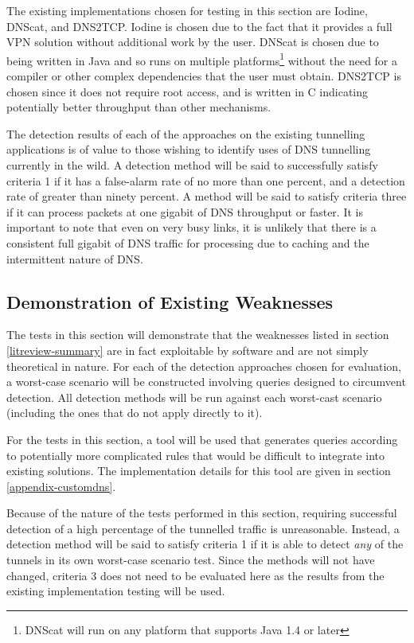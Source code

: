 \documentclass[12pt]{report}
\theoremstyle{remark}
\theoremstyle{definition}
\theoremstyle{definition}
\theoremstyle{definition}
\begin{document}
The existing implementations chosen for testing in this section are
Iodine\cite{iodinesrc}, DNScat\cite{dnscatsrc}, and DNS2TCP\cite{dns2tcpsrc}.
Iodine is chosen due to the fact that it provides a full VPN solution without
additional work by the user. DNScat is chosen due to being written in Java and
so runs on multiple platforms\footnote{DNScat will run on any platform that
supports Java 1.4 or later\cite{dnscatsrc}} without the need for a compiler or
other complex dependencies that the user must obtain. DNS2TCP is chosen since it
does not require root access, and is written in C indicating potentially better
throughput than other mechanisms.

The detection results of each of the approaches on the existing tunnelling
applications is of value to those wishing to identify uses of DNS tunnelling
currently in the wild. A detection method will be said to successfully satisfy
criteria 1 if it has a false-alarm rate of no more than one percent, and a
detection rate of greater than ninety percent. A method will be said to satisfy
criteria three if it can process packets at one gigabit of DNS throughput or
faster. It is important to note that even on very busy links, it is unlikely
that there is a consistent full gigabit of DNS traffic for processing due to
caching and the intermittent nature of DNS.

\subsection{Demonstration of Existing Weaknesses}
\label{test-weakness}
The tests
in this section will demonstrate that the weaknesses listed in section
\ref{litreview-summary} are in fact exploitable by software and are not simply
theoretical in nature. For each of the detection approaches chosen for
evaluation, a worst-case scenario will be constructed involving queries designed
to circumvent detection. All detection methods will be run against each
worst-cast scenario (including the ones that do not apply directly to it).

For the tests in this section, a tool will be used that generates queries
according to potentially more complicated rules that would be difficult to
integrate into existing solutions. The implementation details for this tool are
given in section \ref{appendix-customdns}.

Because of the nature of the tests performed in this section, requiring
successful detection of a high percentage of the tunnelled traffic is
unreasonable. Instead, a detection method will be said to satisfy criteria 1 if
it is able to detect \emph{any} of the tunnels in its own worst-case scenario
test. Since the methods will not have changed, criteria 3 does not need to be
evaluated here as the results from the existing implementation testing will be
used.
\end{document}

